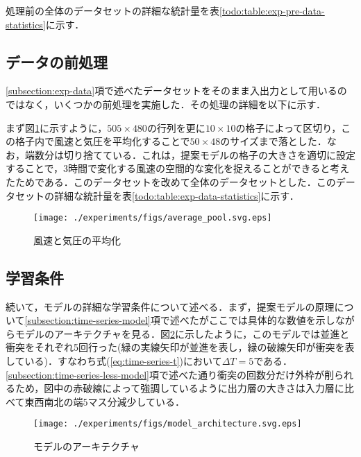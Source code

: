 処理前の全体のデータセットの詳細な統計量を表\ref{todo:table:exp-pre-data-statistics}に示す．

\subsection{データの前処理 \label{subsection:exp-data-preprocessing}}
\ref{subsection:exp-data}項で述べたデータセットをそのまま入出力として用いるのではなく，いくつかの前処理を実施した．その処理の詳細を以下に示す．

まず図\ref{fig:exp-averaging}に示すように，$505 \times 480$の行列を更に$10 \times 10$の格子によって区切り，この格子内で風速と気圧を平均化することで$50 \times 48$のサイズまで落とした．なお，端数分は切り捨てている．これは，提案モデルの格子の大きさを適切に設定することで，3時間で変化する風速の空間的な変化を捉えることができると考えたためである．このデータセットを改めて全体のデータセットとした．このデータセットの詳細な統計量を表\ref{todo:table:exp-data-statistics}に示す．

\begin{figure}[bp]
  \centering
  \texttt{[image: ./experiments/figs/average\_pool.svg.eps]}
  \caption{風速と気圧の平均化}
  \label{fig:exp-averaging}
\end{figure}


\subsection{学習条件 \label{subsection:exp-condition}}

続いて，モデルの詳細な学習条件について述べる．まず，提案モデルの原理について\ref{subsection:time-series-model}項で述べたがここでは具体的な数値を示しながらモデルのアーキテクチャを見る．図\ref{fig:exp-model-architecture}に示したように，このモデルでは並進と衝突をそれぞれ5回行った(緑の実線矢印が並進を表し，緑の破線矢印が衝突を表している)．すなわち式(\ref{eq:time-series-t})において$\Delta T = 5$である．\ref{subsection:time-series-less-model}項で述べた通り衝突の回数分だけ外枠が削られるため，図中の赤破線によって強調しているように出力層の大きさは入力層に比べて東西南北の端$5$マス分減少している．

\begin{figure}[bp]
  \centering
  \texttt{[image: ./experiments/figs/model\_architecture.svg.eps]}
  \caption{モデルのアーキテクチャ}
  \label{fig:exp-model-architecture}
\end{figure}

